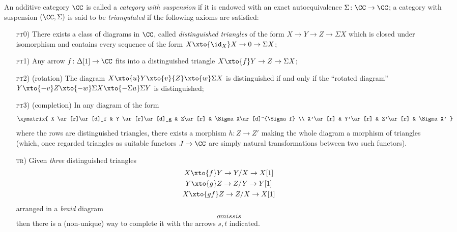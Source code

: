 \begin{definition}
An additive category $\CC$ is called a \emph{category with suspension} if it is endowed with an exact autoequivalence $\Sigma\colon \CC\to\CC$; a category with suspension $(\CC,\Sigma)$ is said to be \emph{triangulated} if the following axioms are satisfied:
\begin{itemize}
\item[\textsc{pt0})] There exists a class of diagrams in $\CC$, called \emph{distinguished triangles} of the form $X\to Y\to Z\to \Sigma X$ which is closed under isomorphism and contains every sequence of the form $X\xto{\id_X}X\to 0\to \Sigma X$;
\item[\textsc{pt1})] Any arrow $f\colon\Delta[1]\to\CC$ fits into a distinguished triangle $X\xto{f}Y\to Z\to \Sigma X$;
\item[\textsc{pt2})] (rotation) The diagram $X\xto{u}Y\xto{v} {Z}\xto{w} \Sigma X$ is distinguished if and only if the ``rotated diagram'' $Y\xto{-v}Z\xto{-w}\Sigma X\xto{-\Sigma u}\Sigma Y$ is distinguished;
\item[\textsc{pt3})] (completion) In any diagram of the form
\[
\xymatrix{
X \ar[r]\ar[d]_f & Y \ar[r]\ar[d]_g & Z\ar[r] & \Sigma X\ar[d]^{\Sigma f} \\
X'\ar[r] & Y'\ar[r] & Z'\ar[r] & \Sigma X' 
}
\]
where the rows are distinguished triangles, there exists a morphism $h\colon Z\to Z'$ making the whole diagram a morphism of triangles (which, once regarded triangles as suitable functors $J\to \CC$ are simply natural transformations between two such functors).
\item[\textsc{tr})] Given \emph{three} distinguished triangles
\begin{gather*}
X\xto{f}Y\to Y/X\to X[1] \\
Y\xto{g}Z\to Z/Y\to Y[1]\\
X\xto{gf}Z\to Z/X\to X[1]
\end{gather*}
arranged in a \emph{braid} diagram
\[
omissis
\]
then there is a (non-unique) way to complete it with the arrows $s,t$ indicated.
\end{itemize}
\end{definition}
